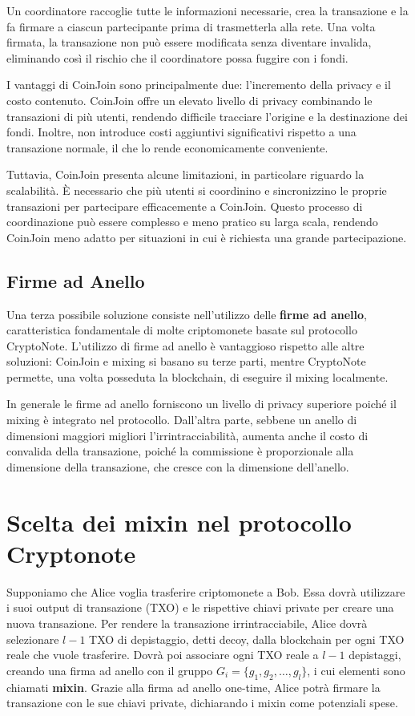 Un coordinatore raccoglie tutte le informazioni necessarie, crea la transazione e la fa firmare a ciascun partecipante prima di trasmetterla alla rete. Una volta firmata, la transazione non può essere modificata senza diventare invalida, eliminando così il rischio che il coordinatore possa fuggire con i fondi.

I vantaggi di CoinJoin sono principalmente due: l'incremento della privacy e il costo contenuto. CoinJoin offre un elevato livello di privacy combinando le transazioni di più utenti, rendendo difficile tracciare l'origine e la destinazione dei fondi. Inoltre, non introduce costi aggiuntivi significativi rispetto a una transazione normale, il che lo rende economicamente conveniente.

Tuttavia, CoinJoin presenta alcune limitazioni, in particolare riguardo la scalabilità. È necessario che più utenti si coordinino e sincronizzino le proprie transazioni per partecipare efficacemente a CoinJoin. Questo processo di coordinazione può essere complesso e meno pratico su larga scala, rendendo CoinJoin meno adatto per situazioni in cui è richiesta una grande partecipazione.

\subsection{Firme ad Anello}
Una terza possibile soluzione consiste nell'utilizzo delle \textbf{firme ad anello}, caratteristica fondamentale di molte criptomonete basate sul protocollo CryptoNote. L'utilizzo di firme ad anello è vantaggioso rispetto alle altre soluzioni: CoinJoin e mixing si basano su terze parti, mentre CryptoNote permette, una volta posseduta la blockchain, di eseguire il mixing localmente.

In generale le firme ad anello forniscono un livello di privacy superiore poiché il mixing è integrato nel protocollo. Dall'altra parte, sebbene un anello di dimensioni maggiori migliori l'irrintracciabilità, aumenta anche il costo di convalida della transazione, poiché la commissione è proporzionale alla dimensione della transazione, che cresce con la dimensione dell'anello.

\section{Scelta dei mixin nel protocollo Cryptonote}
Supponiamo che Alice voglia trasferire criptomonete a Bob. Essa dovrà utilizzare i suoi output di transazione (TXO) e le rispettive chiavi private per creare una nuova transazione. Per rendere la transazione irrintracciabile, Alice dovrà selezionare \(l-1\) TXO di depistaggio, detti decoy, dalla blockchain per ogni TXO reale che vuole trasferire. Dovrà poi associare ogni TXO reale a \(l-1\) depistaggi, creando una firma ad anello con il gruppo \(G_i = \{g_1, g_2, \ldots, g_l\}\), i cui elementi sono chiamati \textbf{mixin}. Grazie alla firma ad anello one-time, Alice potrà firmare la transazione con le sue chiavi private, dichiarando i mixin come potenziali spese.

